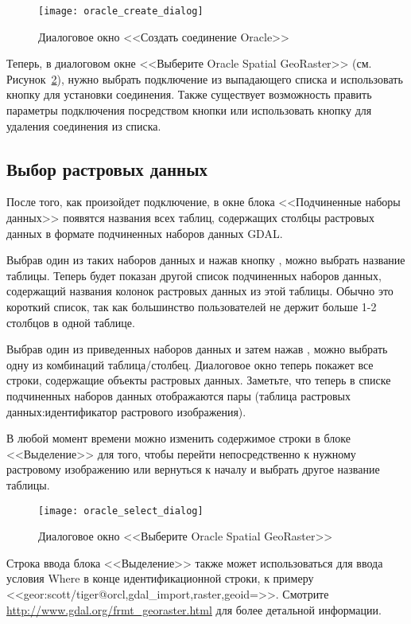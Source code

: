 \begin{figure}[ht]
   \centering
   \texttt{[image: oracle\_create\_dialog]}
   \caption{Диалоговое окно <<Создать соединение Oracle>> \wincaption}\label{fig:oracle_create}
\end{figure}

Теперь, в диалоговом окне <<Выберите Oracle Spatial GeoRaster>>
(см. Рисунок~\ref{fig:oracle_select}), нужно выбрать подключение из
выпадающего списка и использовать кнопку  для
установки соединения. Также существует возможность править параметры
подключения посредством кнопки  или использовать кнопку
 для удаления соединения из списка.

\subsection{Выбор растровых данных}

После того, как произойдет подключение, в окне блока <<Подчиненные
наборы данных>> появятся названия всех таблиц, содержащих столбцы
растровых данных в формате подчиненных наборов данных GDAL.

Выбрав один из таких наборов данных и нажав кнопку , можно
выбрать название таблицы. Теперь будет показан другой список подчиненных
наборов данных, содержащий названия колонок растровых данных из этой
таблицы. Обычно это короткий список, так как большинство пользователей
не держит больше 1-2 столбцов в одной таблице.

Выбрав один из приведенных наборов данных и затем нажав ,
можно выбрать одну из комбинаций таблица/столбец. Диалоговое окно теперь
покажет все строки, содержащие объекты растровых данных. Заметьте, что
теперь в списке подчиненных наборов данных отображаются пары (таблица
растровых данных:идентификатор растрового изображения).

В любой момент времени можно изменить содержимое строки в блоке
<<Выделение>> для того, чтобы перейти непосредственно к нужному
растровому изображению или вернуться к началу и выбрать другое название
таблицы.

\begin{figure}[ht]
   \centering
   \texttt{[image: oracle\_select\_dialog]}
   \caption{Диалоговое окно <<Выберите Oracle Spatial GeoRaster>> \wincaption}\label{fig:oracle_select}
\end{figure}

Строка ввода блока <<Выделение>> также может использоваться для ввода
условия Where в конце идентификационной строки, к примеру
<<geor:scott/tiger@orcl,gdal\_import,raster,geoid=>>. Смотрите \\
\url{http://www.gdal.org/frmt_georaster.html} для более детальной
информации.

